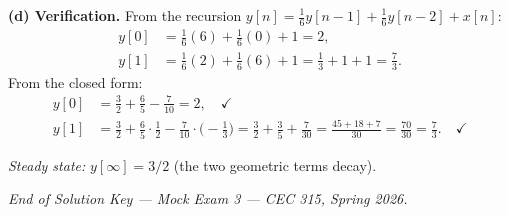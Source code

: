 \documentclass[11pt]{article}
\begin{document}
\textbf{(d) Verification.} From the recursion $y[n] = \tfrac{1}{6}y[n-1] + \tfrac{1}{6}y[n-2] + x[n]$:
\begin{align*}
y[0] &= \tfrac{1}{6}(6) + \tfrac{1}{6}(0) + 1 = 2,\\
y[1] &= \tfrac{1}{6}(2) + \tfrac{1}{6}(6) + 1 = \tfrac{1}{3} + 1 + 1 = \tfrac{7}{3}.
\end{align*}
From the closed form:
\begin{align*}
y[0] &= \tfrac{3}{2} + \tfrac{6}{5} - \tfrac{7}{10} = 2,\quad \checkmark\\
y[1] &= \tfrac{3}{2} + \tfrac{6}{5}\cdot\tfrac{1}{2} - \tfrac{7}{10}\cdot\bigl(-\tfrac{1}{3}\bigr) = \tfrac{3}{2} + \tfrac{3}{5} + \tfrac{7}{30} = \tfrac{45+18+7}{30} = \tfrac{70}{30} = \tfrac{7}{3}.\quad \checkmark
\end{align*}

\textit{Steady state:} $y[\infty] = 3/2$ (the two geometric terms decay).

\vfill
\begin{center}
    \textit{End of Solution Key --- Mock Exam 3 --- CEC 315, Spring 2026.}
\end{center}
\end{document}
